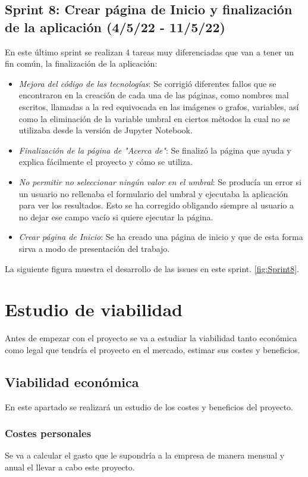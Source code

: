 \subsection{Sprint 8: Crear página de Inicio y finalización de la aplicación (4/5/22 - 11/5/22)}
En este último sprint se realizan 4 tareas muy diferenciadas que van a tener un fin común, la finalización de la aplicación:
\begin{itemize}
    \item \textit{Mejora del código de las tecnologías}: Se corrigió diferentes fallos que se encontraron en la creación de cada una de las páginas, como nombres mal escritos, llamadas a la red equivocada en las imágenes o grafos, variables, así como la eliminación de la variable umbral en ciertos métodos la cual no se utilizaba desde la versión de Jupyter Notebook.
    \item \textit{Finalización de la página de "Acerca de"}: Se finalizó la página que ayuda y explica fácilmente el proyecto y cómo se utiliza.
    \item \textit{No permitir no seleccionar ningún valor en el umbral}: Se producía un error si un usuario no rellenaba el formulario del umbral y ejecutaba la aplicación para ver los resultados. Esto se ha corregido obligando siempre al usuario a no dejar ese campo vacío si quiere ejecutar la página.
    \item \textit{Crear página de Inicio}: Se ha creado una página de inicio y que de esta forma sirva a modo de presentación del trabajo.
\end{itemize}

La siguiente figura muestra el desarrollo de las issues en este sprint. \ref{fig:Sprint8}.


\section{Estudio de viabilidad}
Antes de empezar con el proyecto se va a estudiar la viabilidad tanto económica como legal que tendría el proyecto en el mercado, estimar sus costes y beneficios.

\subsection{Viabilidad económica}
En este apartado se realizará un estudio de los costes y beneficios del proyecto.

\subsubsection{Costes personales}
Se va a calcular el gasto que le supondría a la empresa de manera mensual y anual el llevar a cabo este proyecto.

